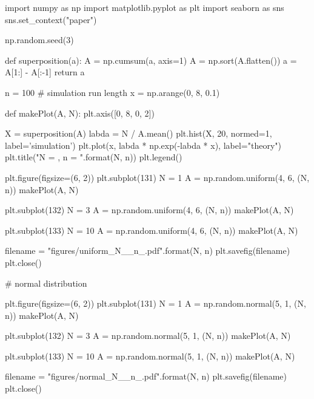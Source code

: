 
import numpy as np
import matplotlib.pyplot as plt
import seaborn as sns
sns.set_context("paper")

np.random.seed(3)


def superposition(a):
    A = np.cumsum(a, axis=1)
    A = np.sort(A.flatten())
    a = A[1:] - A[:-1]
    return a


n = 100 # simulation run length
x = np.arange(0, 8, 0.1)


def makePlot(A, N):
    plt.axis([0, 8, 0, 2])

    X = superposition(A)
    labda = N / A.mean()
    plt.hist(X, 20, normed=1, label='simulation')
    plt.plot(x, labda * np.exp(-labda * x), label="theory")
    plt.title("N = {}, n = {}".format(N, n))
    plt.legend()


plt.figure(figsize=(6, 2))
plt.subplot(131)
N = 1
A = np.random.uniform(4, 6, (N, n))
makePlot(A, N)

plt.subplot(132)
N = 3
A = np.random.uniform(4, 6, (N, n))
makePlot(A, N)

plt.subplot(133)
N = 10
A = np.random.uniform(4, 6, (N, n))
makePlot(A, N)

filename = "figures/uniform_N_{}_n_{}.pdf".format(N, n)
plt.savefig(filename)
plt.close()

# normal distribution

plt.figure(figsize=(6, 2))
plt.subplot(131)
N = 1
A = np.random.normal(5, 1, (N, n))
makePlot(A, N)

plt.subplot(132)
N = 3
A = np.random.normal(5, 1, (N, n))
makePlot(A, N)

plt.subplot(133)
N = 10
A = np.random.normal(5, 1, (N, n))
makePlot(A, N)

filename = "figures/normal_N_{}_n_{}.pdf".format(N, n)
plt.savefig(filename)
plt.close()

